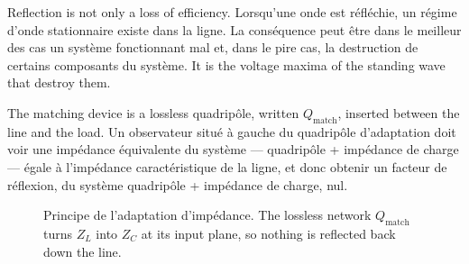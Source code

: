 \begin{remark}
  Reflection is not only a loss of efficiency. Lorsqu'une onde est réfléchie, un
  régime d'onde stationnaire existe dans la ligne. La conséquence peut être dans le
  meilleur des cas un système fonctionnant mal et, dans le pire cas, la destruction de
  certains composants du système. It is the voltage maxima of the standing wave that
  destroy them.
\end{remark}

The matching device is a lossless quadripôle, written $Q_{\text{match}}$, inserted
between the line and the load. Un observateur situé à gauche du quadripôle
d'adaptation doit voir une impédance équivalente du système --- quadripôle +
impédance de charge --- égale à l'impédance caractéristique de la ligne, et donc
obtenir un facteur de réflexion, du système quadripôle + impédance de charge, nul.

\begin{figure}[h!]
  \centering
  \caption*{Principe de l'adaptation d'impédance. The lossless network
  $Q_{\text{match}}$ turns $Z_L$ into $Z_C$ at its input plane, so nothing is reflected
  back down the line.}
\end{figure}

